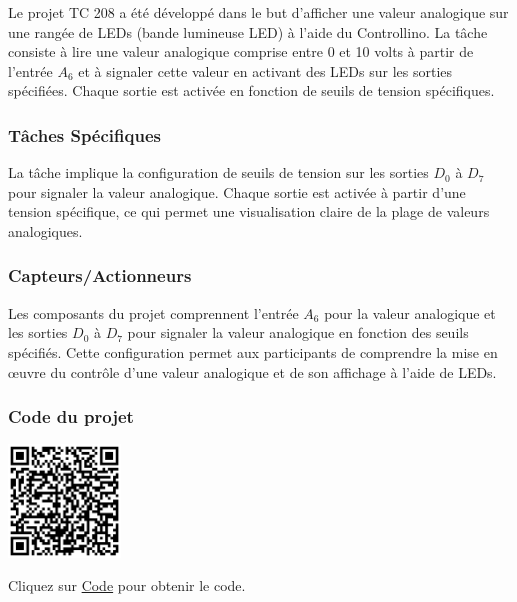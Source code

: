\documentclass[a4paper,12pt]{report}
\begin{document}
Le projet TC 208 a été développé dans le but d'afficher une valeur analogique sur une rangée de LEDs (bande lumineuse LED) à l'aide du Controllino. La tâche consiste à lire une valeur analogique comprise entre 0 et 10 volts à partir de l'entrée \(A_6\) et à signaler cette valeur en activant des LEDs sur les sorties spécifiées. Chaque sortie est activée en fonction de seuils de tension spécifiques.

\subsubsection{Tâches Spécifiques}

La tâche implique la configuration de seuils de tension sur les sorties \(D_0\) à \(D_7\) pour signaler la valeur analogique. Chaque sortie est activée à partir d'une tension spécifique, ce qui permet une visualisation claire de la plage de valeurs analogiques.
\subsubsection{Capteurs/Actionneurs}

Les composants du projet comprennent l'entrée \(A_6\) pour la valeur analogique et les sorties \(D_0\) à \(D_7\) pour signaler la valeur analogique en fonction des seuils spécifiés. Cette configuration permet aux participants de comprendre la mise en œuvre du contrôle d'une valeur analogique et de son affichage à l'aide de LEDs.

\subsubsection{Code du projet}

\begin{minipage}{0.5\textwidth}
    \includegraphics[height=3cm]{Code TC208.png}
\end{minipage}%
\begin{minipage}{0.5\textwidth}
    Cliquez sur \href{https://github.com/DexterTaha/Controllino-PLC-Sample/blob/main/TC200/TC208_Valeur_analogique/TC208_Valeur_analogique.ino}{Code} pour obtenir le code.
\end{minipage}
\end{document}

